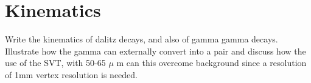 \section{Kinematics}\label{sec:kinematics}

Write the kinematics of dalitz decays, and also of gamma gamma decays. Illustrate how the gamma can externally convert into a \epem pair and discuss how the use of the SVT, with 50-65 $\mu$ m can this overcome background since a resolution of 1mm vertex resolution is needed.

